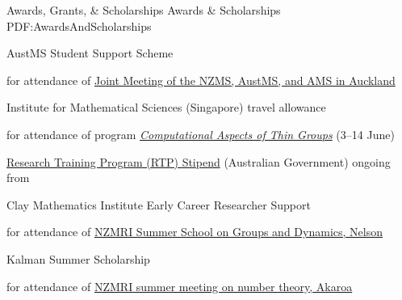 \documentclass[a4paper,yyyy,nonstopmode,10pt]{simpleresumecv}
\begin{document}
\begin{Body}




\Section
{Awards, \newline
Grants, \&\newline
Scholarships}
{Awards \& Scholarships}
{PDF:AwardsAndScholarships}


\Gap
\BulletItem
AustMS Student Support Scheme
\hfill
{}
\begin{Detail}
\SubBulletItem
for attendance of \href{https://ms-meet-2024.blogs.auckland.ac.nz/}{Joint Meeting of the NZMS, AustMS, and AMS in Auckland}
\end{Detail}

\Gap
\BulletItem
Institute for Mathematical Sciences (Singapore) travel allowance
\hfill
{}
\begin{Detail}
\SubBulletItem
for attendance of program \href{https://ims.nus.edu.sg/events/computational-aspects-of-thin-groups/}{\textit{Computational Aspects of Thin Groups}} (3--14 June)
\end{Detail}

\Gap
\BulletItem
\href{https://www.monash.edu/study/fees-scholarships/scholarships/find-a-scholarship/research-training-program-scholarship}{Research Training Program (RTP) Stipend} (Australian Government)
\hfill
ongoing from 

\Gap
\BulletItem
Clay Mathematics Institute Early Career Researcher Support
\hfill
{}
\begin{Detail}
\SubBulletItem
for attendance of \href{https://sites.google.com/view/nzmri2023}{NZMRI Summer School on Groups and Dynamics, Nelson}
\end{Detail}

\Gap
\BulletItem
Kalman Summer Scholarship
\hfill
{}
\begin{Detail}
\SubBulletItem
for attendance of \href{https://www.math.canterbury.ac.nz/~f.voloch/nzmri.html}{NZMRI summer meeting on number theory, Akaroa}
\end{Detail}


\end{Body}
\end{document}
